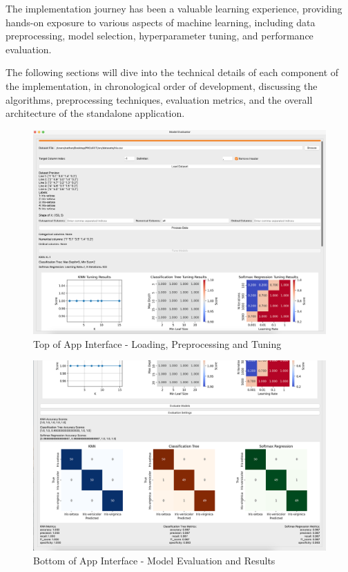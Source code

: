 \documentclass[letterpaper,10pt]{article}
\begin{document}
The implementation journey has been a valuable learning experience, providing hands-on exposure to various aspects of machine learning, including data preprocessing, model selection, hyperparameter tuning, and performance evaluation. \par

The following sections will dive into the technical details of each component of the implementation, in chronological order of development, discussing the algorithms, preprocessing techniques, evaluation metrics, and the overall architecture of the standalone application. \par

\begin{figure}[ht]
    \centering
    \includegraphics[width=1.0\textwidth]{app_top_preview.png}
    \caption{Top of App Interface - Loading, Preprocessing and Tuning}
    \label{fig:app_top}
\end{figure}

\begin{figure}[ht]
    \centering
    \includegraphics[width=1.0\textwidth]{app_bottom_preview.png}
    \caption{Bottom of App Interface - Model Evaluation and Results}
    \label{fig:app_bottom}
\end{figure}
\end{document}
